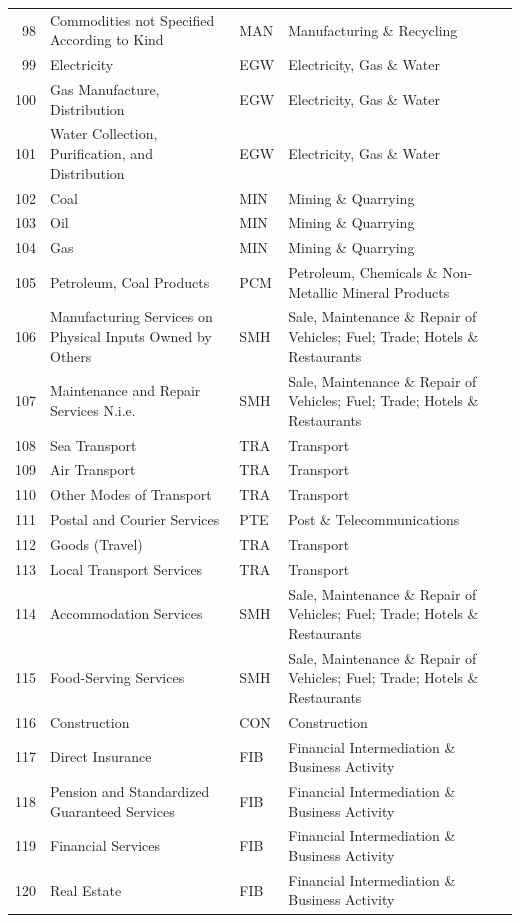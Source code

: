\documentclass[a4paper]{article}
\begin{document}
\begin{table}[ht]
{\begin{tabular}{rlll}
  98 & Commodities not Specified According to Kind & MAN & Manufacturing \& Recycling \\ 
  99 & Electricity & EGW & Electricity, Gas \& Water \\ 
  100 & Gas Manufacture, Distribution & EGW & Electricity, Gas \& Water \\ 
  101 & Water Collection, Puriﬁcation, and Distribution & EGW & Electricity, Gas \& Water \\ 
  102 & Coal & MIN & Mining \& Quarrying \\ 
  103 & Oil & MIN & Mining \& Quarrying \\ 
  104 & Gas & MIN & Mining \& Quarrying \\ 
  105 & Petroleum, Coal Products & PCM & Petroleum, Chemicals \& Non-Metallic Mineral Products \\ 
  106 & Manufacturing Services on Physical Inputs Owned by Others & SMH & Sale, Maintenance \& Repair of Vehicles; Fuel; Trade; Hotels \& Restaurants \\ 
  107 & Maintenance and Repair Services N.i.e. & SMH & Sale, Maintenance \& Repair of Vehicles; Fuel; Trade; Hotels \& Restaurants \\ 
  108 & Sea Transport & TRA & Transport \\ 
  109 & Air Transport & TRA & Transport \\ 
  110 & Other Modes of Transport & TRA & Transport \\ 
  111 & Postal and Courier Services & PTE & Post \& Telecommunications \\ 
  112 & Goods (Travel) & TRA & Transport \\ 
  113 & Local Transport Services & TRA & Transport \\ 
  114 & Accommodation Services & SMH & Sale, Maintenance \& Repair of Vehicles; Fuel; Trade; Hotels \& Restaurants \\ 
  115 & Food-Serving Services & SMH & Sale, Maintenance \& Repair of Vehicles; Fuel; Trade; Hotels \& Restaurants \\ 
  116 & Construction & CON & Construction \\ 
  117 & Direct Insurance & FIB & Financial Intermediation \& Business Activity \\ 
  118 & Pension and Standardized Guaranteed Services & FIB & Financial Intermediation \& Business Activity \\ 
  119 & Financial Services & FIB & Financial Intermediation \& Business Activity \\ 
  120 & Real Estate & FIB & Financial Intermediation \& Business Activity \\ 

\end{tabular}}
\end{table}
\end{document}
